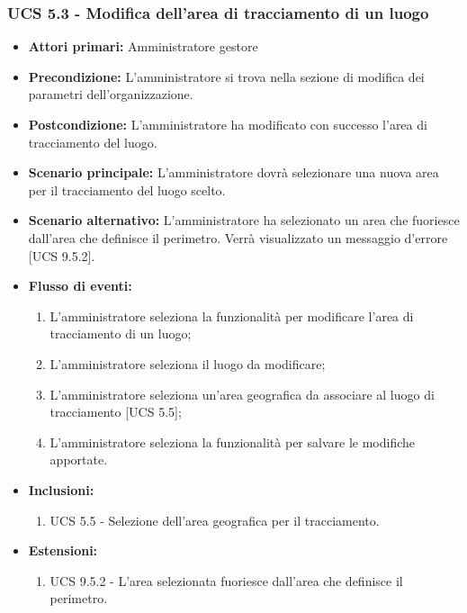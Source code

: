 \subsubsection{UCS 5.3 - Modifica dell'area di tracciamento di un luogo}%
\begin{itemize}
    \item \textbf{Attori primari:} Amministratore gestore
    \item \textbf{Precondizione:} L'amministratore si trova nella sezione di modifica dei parametri dell'organizzazione.
    \item \textbf{Postcondizione:} L'amministratore ha modificato con successo l'area di tracciamento del luogo.
    \item \textbf{Scenario principale:} L'amministratore dovrà selezionare una nuova area per il tracciamento del luogo scelto.
    \item \textbf{Scenario alternativo:} L'amministratore ha selezionato un area che fuoriesce dall'area che definisce il perimetro. Verrà visualizzato un messaggio d'errore [UCS 9.5.2].
    \item \textbf{Flusso di eventi:}
    \begin{enumerate}%
        \item L'amministratore seleziona la funzionalità per modificare l'area di tracciamento di un luogo;
        \item L'amministratore seleziona il luogo da modificare;
        \item L'amministratore seleziona un'area geografica da associare al luogo di tracciamento [UCS 5.5];
        \item L'amministratore seleziona la funzionalità per salvare le modifiche apportate.
    \end{enumerate}
    \item \textbf{Inclusioni:}
    \begin{enumerate}
        \item UCS 5.5 - Selezione dell'area geografica per il tracciamento.
    \end{enumerate}
    \item \textbf{Estensioni:}
    \begin{enumerate}
        \item UCS 9.5.2 - L'area selezionata fuoriesce dall'area che definisce il perimetro.
    \end{enumerate}
\end{itemize}

